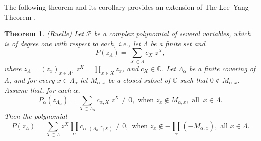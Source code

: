 \documentclass[english,12pt]{ttuthes}
\newtheorem{theorem}{Theorem}[chapter]
\begin{document}
The following theorem and its corollary provides an extension of The
Lee--Yang Theorem \cite{Ruelle:PRL:303}.  
\begin{theorem}(Ruelle)
  \label{thm:Ruelle}
  Let $\mathcal{P}$ be a complex polynomial of several variables, which
  is of degree one with respect to each, \textit{i.e.}, let $\Lambda$ be a
  finite set and 
%  
  \begin{equation*}
    P(z_{\Lambda}) = \sum_{X \subset \Lambda} c_{X} \; z^{X},
  \end{equation*}
%  
  where $z_{\Lambda} = (z_{x})_{x \in \Lambda }$, $z^{X} = \prod_{x \in X} z_{x}$, and
  $c_{X} \in \mathbb{C}$. Let $\Lambda_{\alpha}$ be a finite covering of $\Lambda$, and for
  every $x \in \Lambda_{\alpha}$ let $M_{\alpha,x}$ be a closed subset of
  $\mathbb{C}$ such that $0 \not\in M_{\alpha,x} $. \\
  Assume that, for each $\alpha$,
%  
   \begin{equation*}
    P_{\alpha}(z_{\Lambda_{\alpha}}) = \sum_{X \subset \Lambda_{\alpha}} c_{\alpha,X} \; z^{X} \neq 0, 
    \text{ when }  z_{x} \not\in M_{\alpha,x}, \text{ all } \ x\in\Lambda.
  \end{equation*}
%  
  Then the polynomial
%  
   \begin{equation*}
    P(z_{\Lambda}) = \sum_{X \subset \Lambda}  z^{X} \prod_{\alpha}c_{\alpha,(\Lambda_{\alpha}\bigcap X)} \neq 0, 
     \text{ when } z_{x} \not\in -\prod_{\alpha} (-M_{\alpha,x}), \text{ all }  x\in\Lambda.
  \end{equation*}
%
\end{theorem}
\end{document}
